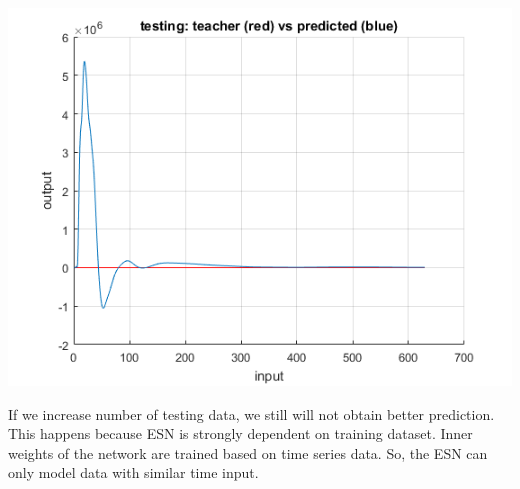\documentclass[a4paper, 12pt]{article}
\begin{document}
\begin{center}
\includegraphics[scale=0.6]{5000lt.png}
\end{center}

If we increase number of testing data, we still will not obtain better prediction. This happens because ESN is strongly dependent on training dataset. Inner weights of the network are trained based on time series data. So, the ESN can only model data with similar time input.
\end{document}
